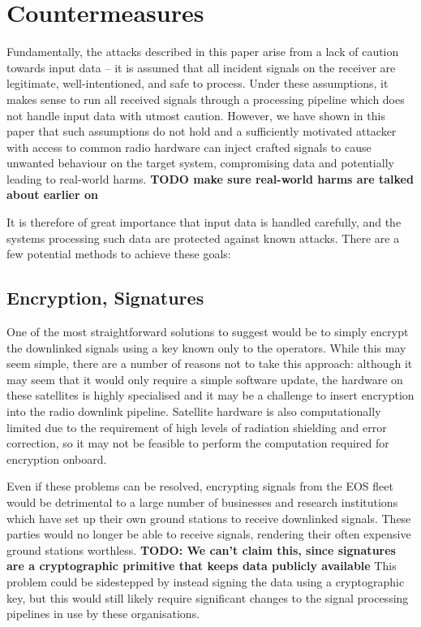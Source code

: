 \section{Countermeasures}\label{sec:countermeasures}

Fundamentally, the attacks described in this paper arise from a lack of caution towards input data -- it is assumed that all incident signals on the receiver are legitimate, well-intentioned, and safe to process.
Under these assumptions, it makes sense to run all received signals through a processing pipeline which does not handle input data with utmost caution.
However, we have shown in this paper that such assumptions do not hold and a sufficiently motivated attacker with access to common radio hardware can inject crafted signals to cause unwanted behaviour on the target system, compromising data and potentially leading to real-world harms.
\textbf{TODO make sure real-world harms are talked about earlier on}

It is therefore of great importance that input data is handled carefully, and the systems processing such data are protected against known attacks.
There are a few potential methods to achieve these goals:

\subsection{Encryption, Signatures}

One of the most straightforward solutions to suggest would be to simply encrypt the downlinked signals using a key known only to the operators.
While this may seem simple, there are a number of reasons not to take this approach: although it may seem that it would only require a simple software update, the hardware on these satellites is highly specialised and it may be a challenge to insert encryption into the radio downlink pipeline.
Satellite hardware is also computationally limited due to the requirement of high levels of radiation shielding and error correction, so it may not be feasible to perform the computation required for encryption onboard.

Even if these problems can be resolved, encrypting signals from the EOS fleet would be detrimental to a large number of businesses and research institutions which have set up their own ground stations to receive downlinked signals.
These parties would no longer be able to receive signals, rendering their often expensive ground stations worthless. \textbf{TODO: We can't claim this, since signatures are a cryptographic primitive that keeps data publicly available}
This problem could be sidestepped by instead signing the data using a cryptographic key, but this would still likely require significant changes to the signal processing pipelines in use by these organisations.


